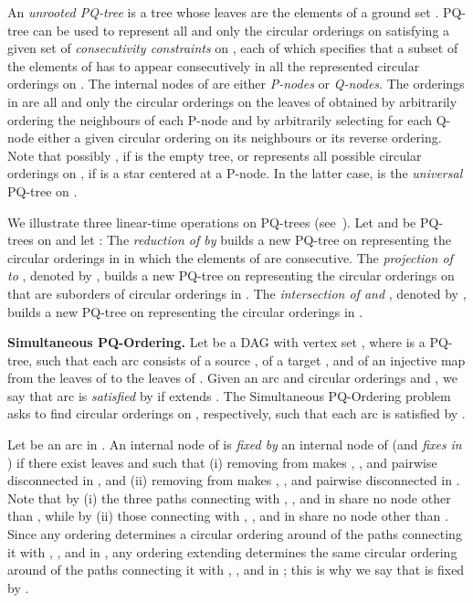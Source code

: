 \documentclass{llncs}
\begin{document}
An \emph{unrooted PQ-tree}  is a tree whose leaves are the elements of a ground set . PQ-tree  can be used to represent all and only the circular orderings  on  satisfying a given set of \emph{consecutivity constraints} on , each of which specifies that a subset of the elements of  has to appear consecutively in all the represented circular orderings on . 
The internal nodes of  are either {\em P-nodes} or {\em Q-nodes}. The orderings in  are all and only the circular orderings on the leaves of  obtained by arbitrarily ordering the neighbours of each P-node and by arbitrarily selecting for each Q-node either a given circular ordering on its neighbours or its reverse ordering.
Note that possibly , if  is the empty tree, or  represents all possible circular orderings on , if  is a star centered at a P-node. In the latter case,  is the {\em universal} PQ-tree on .

We illustrate three linear-time operations on PQ-trees (see~\cite{bl-tcop-76,hrl-tsp-13,hm-ppp-04}). Let  and  be PQ-trees on  and let :
The {\em reduction of  by } builds a new PQ-tree on  representing the circular orderings in  in which the elements of  are consecutive.
The {\em projection of  to }, denoted by , builds a new PQ-tree on  representing the circular orderings on  that are suborders of circular orderings in .
The {\em intersection of  and }, denoted by , builds a new PQ-tree on  representing the circular orderings in .



\smallskip
\noindent
{\bf Simultaneous PQ-Ordering.} Let  be a DAG with vertex set , where  is a PQ-tree, such that each arc  consists of a source , of a target , and of an injective map  from the leaves of  to the leaves of . 
Given an arc  and circular orderings  and , we say that arc  is {\em satisfied} by  if  extends .
The {\sc Simultaneous PQ-Ordering} problem asks to find circular orderings  on , respectively, such that each arc  is satisfied by .

Let  be an arc in . 
An internal node  of  is {\em fixed by} an internal node  of  (and  {\em fixes}  \emph{in} ) if there exist leaves  and  such that 
(i) removing  from  makes , , and  pairwise disconnected in , and
(ii) removing  from  makes , , and  pairwise disconnected in .
Note that by (i) the three paths connecting  with , , and  in  share no node other than , while by (ii) those connecting  with , , and  in  share no node other than .
Since any ordering  determines a circular ordering around  of the paths connecting it with , , and  in , any ordering  extending  determines the same circular ordering around  of the paths connecting it with , , and  in ; this is why we say that  is fixed by .
\end{document}
